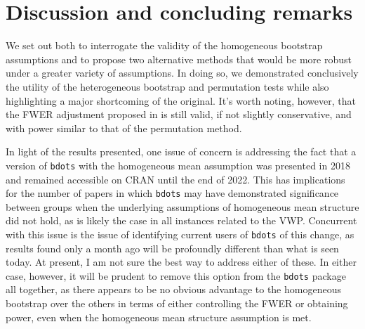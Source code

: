\documentclass{article}
\newcommand{\xt}{\texttt}
\begin{document}

\section{Discussion and concluding remarks}

We set out both to interrogate the validity of the homogeneous bootstrap assumptions and to propose two alternative methods that would be more robust under a greater variety of assumptions. In doing so, we demonstrated conclusively the utility of the heterogeneous bootstrap and permutation tests while also highlighting a major shortcoming of the original. It's worth noting, however, that the FWER adjustment proposed in \cite{oleson2017detecting} is still valid, if not slightly conservative, and with power similar to that of the permutation method. 

In light of the results presented, one issue of concern is addressing the fact that a version of \xt{bdots} with the homogeneous mean assumption was presented in 2018 and remained accessible on CRAN until the end of 2022. This has implications for the number of papers in which \xt{bdots} may have demonstrated significance between groups when the underlying assumptions of homogeneous mean structure did not hold, as is likely the case in all instances related to the VWP. Concurrent with this issue is the issue of identifying current users of \xt{bdots} of this change, as results found only a month ago will be profoundly different than what is seen today. At present, I am not sure the best way to address either of these. In either case, however, it will be prudent to remove this option from the \xt{bdots} package all together, as there appears to be no obvious advantage to the homogeneous bootstrap over the others in terms of either controlling the FWER or obtaining power, even when the homogeneous mean structure assumption is met.
\end{document}
